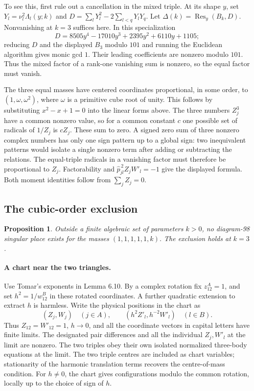 \documentclass[11pt,letterpaper]{article}
\newtheorem{proposition}[theorem]{Proposition}
\theoremstyle{definition}
\begin{document}
To see this, first rule out a cancellation in the mixed triple.
At its shape \(y\), set \(Y_l=\nu_l^2\Lambda_l(y;k)\) and
\(D=\sum_lY_l^2-2\sum_{l<q}Y_lY_q\). Let $\Delta(k)=\operatorname{Res}_y(B_k,D)$. Nonvanishing at $k=3$ suffices here. In this specialization
\[
D=8505y^4-17010y^3+2395y^2+6110y+1105 ;
\]
reducing $D$ and the displayed $B_3$ modulo $101$ and running the Euclidean algorithm gives monic gcd $1$. Their leading coefficients are nonzero modulo $101$.
Thus the mixed factor of a rank-one
vanishing sum is nonzero, so the equal factor must vanish.

The three equal masses have centered coordinates proportional, in some
order, to \((1,\omega,\omega^2)\), where \(\omega\) is a primitive cube
root of unity. This follows by substituting \(x^2-x+1=0\) into the
linear forms above. The three numbers \(Z_j^3\) have a common nonzero
value, so for a common constant \(c\) one possible set of radicals
of \(1/Z_j\) is \(cZ_j\). These sum to zero. A signed zero sum of
three nonzero complex numbers has only one sign pattern up to a
global sign: two inequivalent patterns would isolate a single nonzero
term after adding or subtracting the relations. The equal-triple
radicals in a vanishing factor must therefore be proportional to
\(Z_j\). Factorability and
\(\widehat p_{jl}^{\,2}Z_jW'_l=-1\) give the displayed formula.
Both moment identities follow from \(\sum_j Z_j=0\).

\subsection{The cubic-order exclusion}\label{early:98cubic}

\begin{proposition}\label{early:cubic-prop} Outside a finite algebraic set of parameters
\(k>0\), no diagram-98 singular place exists for the masses
\((1,1,1,1,1,k)\). The exclusion holds at \(k=3\).\end{proposition}

\paragraph{A chart near the two triangles.}
Use Tomar's exponents in Lemma 6.10. By a complex rotation fix
\(z^A_{12}=1\), and set \(h^2=1/w^B_{12}\) in these rotated
coordinates. A further quadratic extension to extract \(h\) is harmless.
Write the physical positions in the chart as
\[
 (Z_j,W_j)\quad(j\in A),\qquad (h^2 Z'_l,h^{-2} W'_l)\quad(l\in B).
\]
Thus \(Z_{12}=W'_{12}=1\), \(h\to0\), and all the coordinate
vectors in capital letters have finite limits. The designated pair
differences and all the individual \(Z_j,W'_l\) at the limit are nonzero.
The two triples obey their own isolated normalized three-body equations at
the limit. The two triple centres are included as chart variables; stationarity of the harmonic translation terms recovers the centre-of-mass condition. For \(h\ne0\),
the chart gives configurations modulo the common rotation, locally up
to the choice of sign of \(h\).
\end{document}
